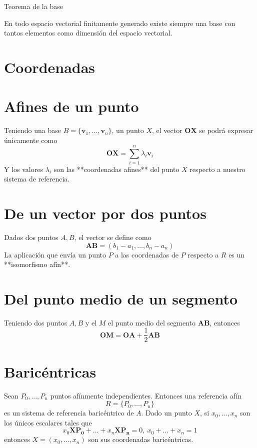 \documentclass{./Geometria.tex}
\begin{document}
\begin{teorema}
Teorema de la base

En todo espacio vectorial finitamente generado existe siempre una base con tantos elementos como dimensión del espacio vectorial.
\end{teorema}

\section{Coordenadas}
\section{Afines de un punto}
Teniendo una base $B=\{ \mathbf{v}_{1},\dots,\mathbf{v}_{n} \}$, un punto $X$, el vector $\mathbf{OX}$ se podrá expresar únicamente como
$$
\mathbf{OX}=\sum_{i=1}^n\lambda_{i}\mathbf{v}_{i}
$$
Y los valores $\lambda_{i}$ son las **coordenadas afines** del punto $X$ respecto a nuestro sistema de referencia.
\section{De un vector por dos puntos}
Dados dos puntos $A,B$, el vector se define como
$$
\mathbf{AB}=(b_{1}-a_{1},\dots,b_{n}-a_{n})
$$
La aplicación  que envía un punto $P$ a las coordenadas de $P$ respecto a $R$ es un **isomorfismo afín**.
\section{Del punto medio de un segmento}
Teniendo dos puntos $A,B$ y el $M$ el punto medio del segmento $\mathbf{AB}$, entonces
$$
\mathbf{OM}=\mathbf{OA}+\frac{1}{2}\mathbf{AB}
$$
\section{Baricéntricas}
Sean $P_{0},\dots,P_{n}$ puntos afínmente independientes. Entonces una referencia afín
$$
R=\{ P_{0},\dots,P_{n} \}
$$
es un sistema de referencia baricéntrico de $A$. Dado un punto $X$, si $x_{0},\dots,x_{n}$ son los únicos escalares tales que
$$
x_{0}\mathbf{XP_{0}}+\dots+x_{n}\mathbf{XP_{n}}=0,~ x_{0}+\dots+x_{n}=1
$$
entonces $X=(x_{0},\dots,x_{n})$ son sus coordenadas baricéntricas.
\end{document}

